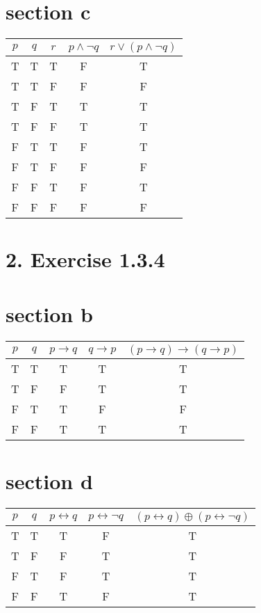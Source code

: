 \documentclass[10pt]{article}
\begin{document}
\section*{section c}
\begin{center}
\begin{tabular}{|c|c|c|c|c|}
\hline
$p$ & $q$ & $r$ & $p \wedge \neg q$ & $r \vee(p \wedge \neg q)$ \\
\hline
T & T & T & F & T \\
\hline
T & T & F & F & F \\
\hline
T & F & T & T & T \\
\hline
T & F & F & T & T \\
\hline
F & T & T & F & T \\
\hline
F & T & F & F & F \\
\hline
F & F & T & F & T \\
\hline
F & F & F & F & F \\
\hline
\end{tabular}
\end{center}

\section*{2. Exercise 1.3.4}
\section*{section b}
\begin{center}
\begin{tabular}{|c|c|c|c|c|}
\hline
$p$ & $q$ & $p \rightarrow q$ & $q \rightarrow p$ & $(p \rightarrow q) \rightarrow(q \rightarrow p)$ \\
\hline
T & T & T & T & T \\
\hline
T & F & F & T & T \\
\hline
F & T & T & F & F \\
\hline
F & F & T & T & T \\
\hline
\end{tabular}
\end{center}

\section*{section d}
\begin{center}
\begin{tabular}{|c|c|c|c|c|}
\hline
$p$ & $q$ & $p \leftrightarrow q$ & $p \leftrightarrow \neg q$ & $(p \leftrightarrow q) \oplus(p \leftrightarrow \neg q)$ \\
\hline
T & T & T & F & T \\
\hline
T & F & F & T & T \\
\hline
F & T & F & T & T \\
\hline
F & F & T & F & T \\
\hline
\end{tabular}
\end{center}
\end{document}
